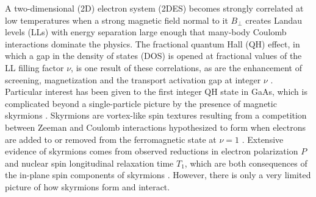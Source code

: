 \documentclass
[aps,prl,twocolumn,superscriptaddress,showpacs,floatfix]{revtex4-1}%
\begin{document}
A two-dimensional (2D) electron system (2DES) becomes strongly correlated at low temperatures when a strong magnetic field normal to it $B_{\perp}$ creates Landau levels (LLs) with energy separation large enough that many-body Coulomb interactions dominate the physics. The fractional quantum Hall (QH) effect, in which a gap in the density of states (DOS) is opened at fractional values of the LL filling factor $\nu$, is one result of these correlations, as are the enhancement of screening, magnetization and the transport activation gap at integer $\nu$ \cite{Eisenstein,Pascher,Meinel,Nicholas,Usher,Schmeller}. Particular interest has been given to the first integer QH state in GaAs, which is complicated beyond a single-particle picture by the presence of magnetic skyrmions \cite{Barrett}. Skyrmions are vortex-like spin textures resulting from a competition between Zeeman and Coulomb interactions hypothesized to form when electrons are added to or removed from the ferromagnetic state at $\nu=1$ \cite{Sondhi}. Extensive evidence of skyrmions comes from observed reductions in electron polarization $P$ and nuclear spin longitudinal relaxation time $T_1$, which are both consequences of the in-plane spin components of skyrmions \cite{Aifer,Melinte,Khandelwal,Zhitomirsky,Plochocka,Piot,Hashimoto,Guan,Cote,Groshaus}. However, there is only a very limited picture of how skyrmions form and interact.
\end{document}

